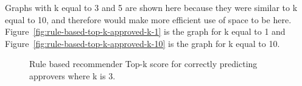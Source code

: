 \begin{center}
Graphs with k equal to 3 and 5 are shown here because they were similar to k equal to 10, and therefore would make more efficient use of space to be here. Figure~\ref{fig:rule-based-top-k-approved-k-1} is the graph for k equal to 1 and Figure~\ref{fig:rule-based-top-k-approved-k-10} is the graph for k equal to 10.

\begin{figure}[H]%
    \centering
    \caption{Rule based recommender Top-k score for correctly predicting approvers where k is 3.}%
    \label{fig:rule-based-top-k-approved-k-3-appendix-c}%
\end{figure}


\end{center}
